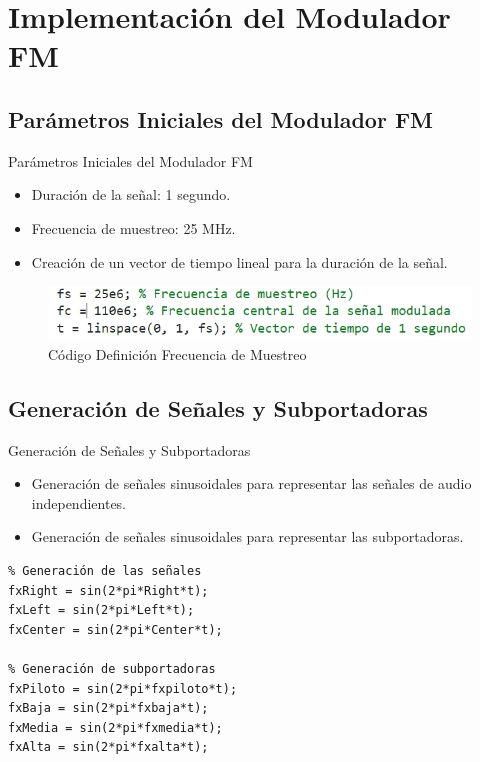 \documentclass[mathserif,spanish]{beamer}
\begin{document}
\section{Implementación del Modulador FM}

\subsection{Parámetros Iniciales del Modulador FM}
\begin{frame}{Parámetros Iniciales del Modulador FM}
    \begin{itemize}
        \item Duración de la señal: 1 segundo.
        \item Frecuencia de muestreo: 25 MHz.
        \item Creación de un vector de tiempo lineal para la duración de la señal.
    \end{itemize}
    \begin{figure}[h]
        \centering
        \includegraphics[width=\textwidth]{F_muestreo.png}
        \caption{Código Definición Frecuencia de Muestreo}
    \end{figure}
\end{frame}

\subsection{Generación de Señales y Subportadoras}
\begin{frame}{Generación de Señales y Subportadoras}
    \begin{itemize}
        \item Generación de señales sinusoidales para representar las señales de audio independientes.
        \item Generación de señales sinusoidales para representar las subportadoras.
    \end{itemize}
    \begin{tcolorbox}[colback=yellow!5!white, colframe=yellow!75!black, title=Generación de Señales y Subportadoras, fonttitle=\normalsize, fontupper=\normalsize]
\begin{lstlisting}
% Generación de las señales
fxRight = sin(2*pi*Right*t);
fxLeft = sin(2*pi*Left*t);
fxCenter = sin(2*pi*Center*t);

% Generación de subportadoras
fxPiloto = sin(2*pi*fxpiloto*t);
fxBaja = sin(2*pi*fxbaja*t);
fxMedia = sin(2*pi*fxmedia*t);
fxAlta = sin(2*pi*fxalta*t);
\end{lstlisting}
    \end{tcolorbox}
\end{frame}
\end{document}
